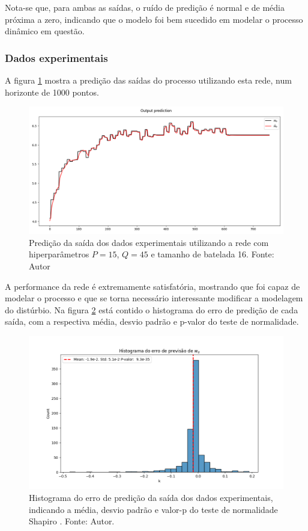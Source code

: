 Nota-se que, para ambas as saídas, o ruído de predição é normal e de média próxima a zero, indicando que o modelo foi bem sucedido em modelar o processo dinâmico em questão.

\subsubsection{Dados experimentais}
A figura \ref{fig:exp_lstm_prediction} mostra a predição das saídas do processo utilizando esta rede, num horizonte de 1000 pontos.
\begin{figure}[hbt!]
    \centering
    \includegraphics[width=0.7\linewidth]{Imagens/chap04/experiment_lstm_prediction.png}
    \caption{Predição da saída dos dados experimentais utilizando a rede com hiperparâmetros $P=15$, $Q=45$ e tamanho de batelada 16. Fonte: Autor}
    \label{fig:exp_lstm_prediction}
\end{figure}

A performance da rede é extremamente satisfatória, mostrando que foi capaz de modelar o processo e que se torna necessário interessante modificar a modelagem do distúrbio. Na figura \ref{fig:exp_error_histogram} está contido o histograma do erro de predição de cada saída, com a respectiva média, desvio padrão e p-valor do teste de normalidade.

\begin{figure}[hbt!]
    \centering
    \includegraphics[width=0.7\linewidth]{Imagens/chap04/experiment_error_histogram.png}
    \caption{Histograma do erro de predição da saída dos dados experimentais, indicando a média, desvio padrão e valor-p do teste de normalidade Shapiro \cite{shapiro1965analysis}. Fonte: Autor.}
    \label{fig:exp_error_histogram}
\end{figure}

